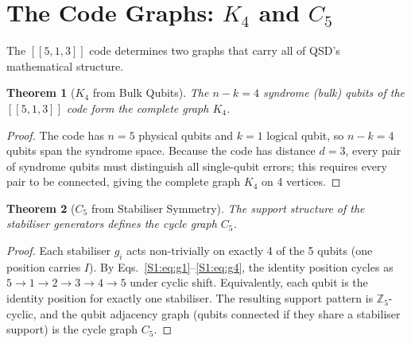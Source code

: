 \documentclass[11pt,a4paper]{article}
\newtheorem{theorem}{Theorem}[section]
\theoremstyle{definition}
\begin{document}
\section{The Code Graphs: \texorpdfstring{$K_4$}{K4} and \texorpdfstring{$C_5$}{C5}}
\label{S1:sec:graphs}

The $[[5,1,3]]$ code determines two graphs that carry all of QSD's mathematical structure.

\begin{theorem}[$K_4$ from Bulk Qubits]
\label{S1:thm:K4}
The $n - k = 4$ syndrome (bulk) qubits of the $[[5,1,3]]$ code form the complete graph $K_4$.
\end{theorem}

\begin{proof}
The code has $n = 5$ physical qubits and $k = 1$ logical qubit, so $n - k = 4$ qubits span the syndrome space. Because the code has distance $d = 3$, every pair of syndrome qubits must distinguish all single-qubit errors; this requires every pair to be connected, giving the complete graph $K_4$ on 4 vertices.
\end{proof}

\begin{theorem}[$C_5$ from Stabiliser Symmetry]
\label{S1:thm:C5}
The support structure of the stabiliser generators defines the cycle graph $C_5$.
\end{theorem}

\begin{proof}
Each stabiliser $g_i$ acts non-trivially on exactly 4 of the 5 qubits (one position carries $I$). By Eqs.~\eqref{S1:eq:g1}--\eqref{S1:eq:g4}, the identity position cycles as $5 \to 1 \to 2 \to 3 \to 4 \to 5$ under cyclic shift. Equivalently, each qubit is the identity position for exactly one stabiliser. The resulting support pattern is $\mathbb{Z}_5$-cyclic, and the qubit adjacency graph (qubits connected if they share a stabiliser support) is the cycle graph $C_5$.
\end{proof}
\end{document}
